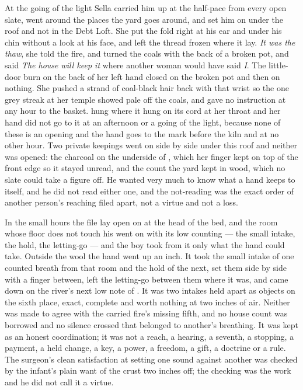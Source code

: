 \scenebreak

At the going of the light Sella carried him up at the half-pace from every open slate, went around the places the yard goes around, and set him on  under the roof and not in the Debt Loft. She put the fold right at his ear and under his chin without a look at his face, and left the thread frozen where it lay. \emph{It was the thaw}, she told the fire, and turned the coals with the back of a broken pot, and said \emph{The house will keep it} where another woman would have said \emph{I}. The little-door burn on the back of her left hand closed on the broken pot and then on nothing. She pushed a strand of coal-black hair back with that wrist so the one grey streak at her temple showed pale off the coals, and gave no instruction at any hour to the basket.  hung where it hung on its cord at her throat and her hand did not go to it at an afternoon or a going of the light, because none of these is an opening and the hand goes to the mark before the kiln and at no other hour. Two private keepings went on side by side under this roof and neither was opened: the charcoal on the underside of , which her finger kept on top of the front edge so it stayed unread, and the count the yard kept in wood, which no slate could take a figure off. He wanted very much to know what a hand keeps to itself, and he did not read either one, and the not-reading was the exact order of another person's reaching filed apart, not a virtue and not a loss.

In the small hours the file lay open on  at the head of the bed, and the room whose floor does not touch his went on with its low counting --- the small intake, the hold, the letting-go --- and the boy took from it only what the hand could take. Outside the wool the hand went up an inch. It took the small intake of one counted breath from that room and the hold of the next, set them side by side with a finger between, left the letting-go between them where it was, and came down on the river's next low note of . It was two intakes held apart as objects on the sixth place, exact, complete and worth nothing at two inches of air. Neither was made to agree with the carried fire's missing fifth, and no house count was borrowed and no silence crossed that belonged to another's breathing. It was kept as an honest coordination; it was not a reach, a hearing, a seventh, a stopping, a payment, a held change, a key, a power, a freedom, a gift, a doctrine or a rule. The surgeon's clean satisfaction at setting one sound against another was checked by the infant's plain want of the crust two inches off; the checking was the work and he did not call it a virtue.

